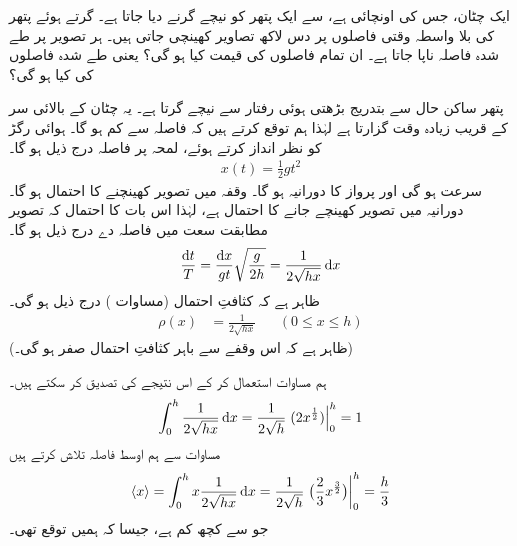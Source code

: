 ایک چٹان،  جس کی اونچائی  ہے،  سے ایک پتھر کو نیچے گرنے دیا جاتا ہے۔ گرتے ہوئے پتھر کی بلا واسطہ وقتی فاصلوں پر دس لاکھ تصاویر کھینچی جاتی ہیں۔ ہر تصویر پر طے شدہ فاصلہ ناپا جاتا ہے۔ ان تمام فاصلوں کی قیمت کیا ہو گی؟ یعنی طے شدہ فاصلوں کی  کیا ہو گی؟ 

پتھر ساکن حال سے بتدریج بڑھتی ہوئی رفتار سے نیچے گرتا ہے۔ یہ چٹان کے بالائی سر کے قریب زیادہ وقت گزارتا ہے لہٰذا ہم توقع کرتے ہیں کہ
 فاصلہ  سے کم ہو گا۔ ہوائی رگڑ کو نظر انداز کرتے ہوئے، لمحہ  پر فاصلہ  درج ذیل ہو گا۔
\begin{align*}
 x(t) = \frac{1}{2} gt^2 
\end{align*}
سرعت  ہو گی  اور پرواز کا دورانیہ  ہو گا۔ وقفہ  میں تصویر کھینچنے کا احتمال  ہو گا۔  دورانیہ  میں  تصویر کھینچے جانے کا احتمال   ہے، لہٰذا   اس بات  کا احتمال کہ  تصویر مطابقت سعت  میں فاصلہ دے درج ذیل ہو گا۔
 \begin{align*}
 \frac{\dif t}{T} = \frac{\dif x}{gt}\sqrt{\frac{g}{2h}} = \frac{1}{2\sqrt{hx}}\dif x
\end{align*} 
 ظاہر ہے کہ کثافتِ احتمال (مساوات ) درج ذیل ہو گی۔
 \begin{align*}
 \rho(x)&=\frac{1}{2\sqrt{hx}} && (0\leq x\leq h)
 \end{align*}
 (ظاہر ہے کہ اس وقفے  سے باہر کثافتِ احتمال صفر ہو گی۔) 

ہم مساوات  استعمال کر کے   اس نتیجے کی تصدیق کر سکتے ہیں۔
 \begin{align*}
 \int_0^h \frac{1}{2\sqrt{hx}}\dif x = \frac{1}{2\sqrt{h}}\left .(2x^{\frac{1}{2}})\right\vert_0^h =1
 \end{align*}
 مساوات  سے ہم اوسط فاصلہ تلاش کرتے ہیں
 \begin{align*}
 \langle x\rangle =\int_0^h x\frac{1}{2\sqrt{hx}}\dif x= \frac{1}{2\sqrt{h}} \left . \big(\frac{2}{3}x^{\frac{3}{2}}\big)\right\vert_0^h = \frac{h}{3}
 \end{align*}
 جو  سے کچھ کم ہے، جیسا کہ ہمیں توقع تھی۔


